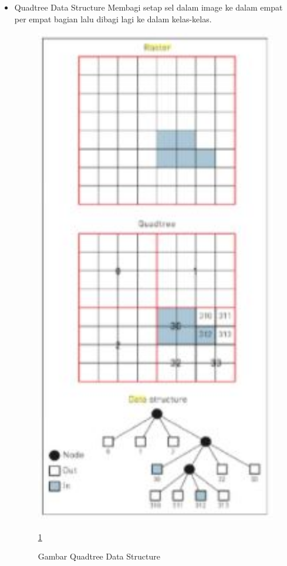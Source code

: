 \begin{itemize}
		\item  Quadtree Data Structure
				Membagi setap sel dalam image ke dalam empat per empat bagian lalu dibagi lagi ke dalam kelas-kelas.
				\begin{figure} [ht]
					\centerline{\includegraphics[width=1\textwidth]{figures/quadtreedatastructure.JPG}}
					\caption{Gambar Quadtree Data Structure}
					\label{quadtreedatastructure}
					\ref{quadtreedatastructure}
				\end{figure}
	\end{itemize}

